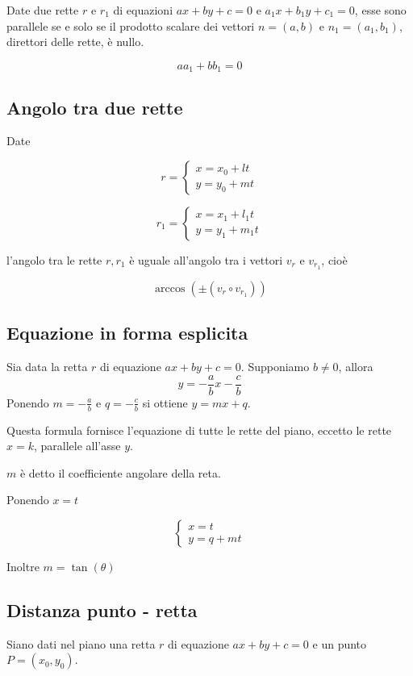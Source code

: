 Date due rette $r$ e $r_1$ di equazioni $ax+by+c=0$ e $a_1x+b_1y+c_1=0$, esse sono parallele se e solo se il prodotto scalare dei vettori $n  = (a,b)$ e $n_1 = (a_1,b_1)$, direttori delle rette, è nullo.

$$aa_1+bb_1 = 0$$

\subsection{Angolo tra due rette}

Date

$$
r = \begin{cases}
x = x_0 + lt \\
y = y_0 + mt
\end{cases}
$$

$$
r_1 = \begin{cases}
x = x_1 + l_1t \\
y = y_1 + m_1t
\end{cases}
$$

l'angolo tra le rette $r,r_1$ è uguale all'angolo tra i vettori $v_r$ e $v_{r_1}$, cioè

$$\arccos(\pm (v_r \circ v_{r_1}))$$

\subsection{Equazione in forma esplicita}

Sia data la retta $r$ di equazione $ax+by+c=0$. Supponiamo $b \neq 0$, allora
$$y = -\frac{a}{b} x - \frac{c}{b}$$
Ponendo $m= -\frac{a}{b}$ e $q = -\frac{c}{b}$ si ottiene $y=mx+q$.

Questa formula fornisce l'equazione di tutte le rette del piano, eccetto le rette $x=k$, parallele all'asse $y$.

$m$ è detto il coefficiente angolare della reta.

Ponendo $x=t$

$$
\begin{cases}
x= t \\
y=q+mt
\end{cases}
$$

Inoltre
$m = \tan(\theta)$


\subsection{Distanza punto - retta}

Siano dati nel piano una retta $r$ di equazione $ax+by+c=0$ e un punto $P = (x_0,y_0)$.


